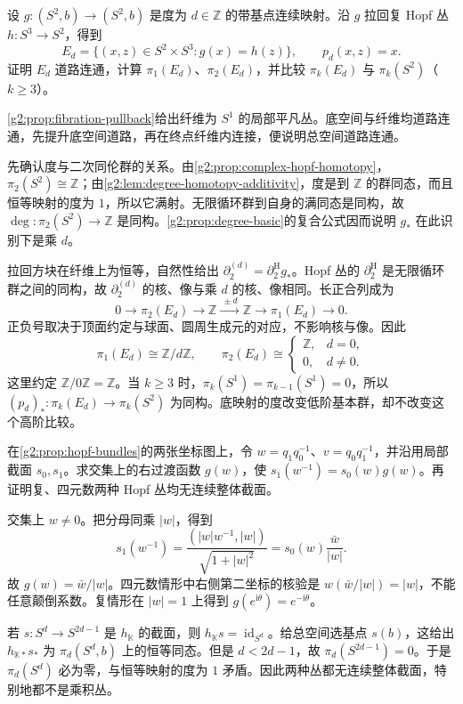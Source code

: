 \begin{exercise}\label{g2:ex:hopf-pullback-degree}
	设 \(g:(S^2,b)\to(S^2,b)\) 是度为 \(d\in\mathbb Z\) 的带基点连续映射。沿 \(g\) 拉回复 Hopf 丛 \(h:S^3\to S^2\)，得到
	\[
		E_d=\{(x,z)\in S^2\times S^3:g(x)=h(z)\},\qquad p_d(x,z)=x.
	\]
	证明 \(E_d\) 道路连通，计算 \(\pi_1(E_d)\)、\(\pi_2(E_d)\)，并比较 \(\pi_k(E_d)\) 与 \(\pi_k(S^2)\)（\(k\ge3\)）。
\end{exercise}
\begin{solution}
	\cref{g2:prop:fibration-pullback}给出纤维为 \(S^1\) 的局部平凡丛。底空间与纤维均道路连通，先提升底空间道路，再在终点纤维内连接，便说明总空间道路连通。

	先确认度与二次同伦群的关系。由\cref{g2:prop:complex-hopf-homotopy}，\(\pi_2(S^2)\cong\mathbb Z\)；由\cref{g2:lem:degree-homotopy-additivity}，度是到 \(\mathbb Z\) 的群同态，而且恒等映射的度为 \(1\)，所以它满射。无限循环群到自身的满同态是同构，故 \(\deg:\pi_2(S^2)\to\mathbb Z\) 是同构。\cref{g2:prop:degree-basic}的复合公式因而说明 \(g_*\) 在此识别下是乘 \(d\)。

	拉回方块在纤维上为恒等，自然性给出 \(\partial^{(d)}_2=\partial^{\mathrm H}_2g_*\)。Hopf 丛的 \(\partial^{\mathrm H}_2\) 是无限循环群之间的同构，故 \(\partial^{(d)}_2\) 的核、像与乘 \(d\) 的核、像相同。长正合列成为
	\[
		0\longrightarrow\pi_2(E_d)\longrightarrow\mathbb Z\xrightarrow{\ \pm d\ }\mathbb Z
		\longrightarrow\pi_1(E_d)\longrightarrow0.
	\]
	正负号取决于顶面约定与球面、圆周生成元的对应，不影响核与像。因此
	\[
		\pi_1(E_d)\cong\mathbb Z/d\mathbb Z,\qquad
		\pi_2(E_d)\cong
		\begin{cases}\mathbb Z,&d=0,\\0,&d\ne0.\end{cases}
	\]
	这里约定 \(\mathbb Z/0\mathbb Z=\mathbb Z\)。当 \(k\ge3\) 时，\(\pi_k(S^1)=\pi_{k-1}(S^1)=0\)，所以 \((p_d)_*:\pi_k(E_d)\to\pi_k(S^2)\) 为同构。底映射的度改变低阶基本群，却不改变这个高阶比较。
\end{solution}

\begin{exercise}\label{g2:ex:hopf-transitions-sections}
	在\cref{g2:prop:hopf-bundles}的两张坐标图上，令 \(w=q_1q_0^{-1}\)、\(v=q_0q_1^{-1}\)，并沿用局部截面 \(s_0,s_1\)。求交集上的右过渡函数 \(g(w)\)，使 \(s_1(w^{-1})=s_0(w)g(w)\)。再证明复、四元数两种 Hopf 丛均无连续整体截面。
\end{exercise}
\begin{solution}
	交集上 \(w\ne0\)。把分母同乘 \(|w|\)，得到
	\[
		s_1(w^{-1})=\frac{(|w|w^{-1},|w|)}{\sqrt{1+|w|^2}}
		=s_0(w)\frac{\bar w}{|w|}.
	\]
	故 \(g(w)=\bar w/|w|\)。四元数情形中右侧第二坐标的核验是 \(w(\bar w/|w|)=|w|\)，不能任意颠倒系数。复情形在 \(|w|=1\) 上得到 \(g(e^{\mathrm{i}\theta})=e^{-\mathrm{i}\theta}\)。

	若 \(s:S^d\rightarrow S^{2d-1}\) 是 \(h_{\mathbb K}\) 的截面，则 \(h_{\mathbb K}s=\operatorname{id}_{S^d}\)。给总空间选基点 \(s(b)\)，这给出 \(h_{\mathbb K*}s_*\) 为 \(\pi_d(S^d,b)\) 上的恒等同态。但是 \(d<2d-1\)，故 \(\pi_d(S^{2d-1})=0\)。于是 \(\pi_d(S^d)\) 必为零，与恒等映射的度为 \(1\) 矛盾。因此两种丛都无连续整体截面，特别地都不是乘积丛。
\end{solution}

